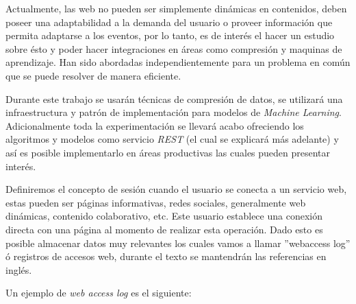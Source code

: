   Actualmente, las web no pueden ser simplemente dinámicas en contenidos, deben poseer una adaptabilidad a la demanda del usuario o proveer información que permita adaptarse a los eventos, por lo tanto, es de interés el hacer un estudio sobre ésto y poder hacer integraciones en áreas como compresión y maquinas de aprendizaje. Han sido abordadas independientemente para un problema en común que se puede resolver de manera eficiente. 

  Durante este trabajo se usarán técnicas de compresión de datos, se utilizará una infraestructura y patrón de implementación para modelos de \emph{Machine Learning}. Adicionalmente toda la experimentación se llevará acabo ofreciendo los algoritmos y modelos como servicio \emph{REST} (el cual se explicará más adelante) y así es posible implementarlo en áreas productivas las cuales pueden presentar interés.


  Definiremos el concepto de sesión cuando el usuario se conecta a un servicio web, estas pueden ser páginas informativas, redes sociales, generalmente web dinámicas, contenido colaborativo, etc. Este usuario establece una conexión directa con una página al momento de realizar esta operación. Dado esto es posible almacenar datos muy relevantes los cuales vamos a llamar ''webaccess log'' ó registros de accesos web, durante el texto se mantendrán las referencias en inglés.

  Un ejemplo de \emph{web access log} es el siguiente:



